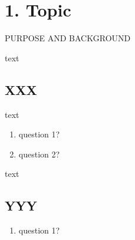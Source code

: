 \documentclass[11pt]{NSF}
\def\ben{\begin{enumerate}}
\def\een{\end{enumerate}}
\begin{document}
     
\section{1. Topic}

PURPOSE AND BACKGROUND

text

\subsection{XXX}

text

\ben
\item
question 1?

\item
question 2?
\een

text

\subsection{YYY}

\ben
\item
question 1?

\een
\end{document}
